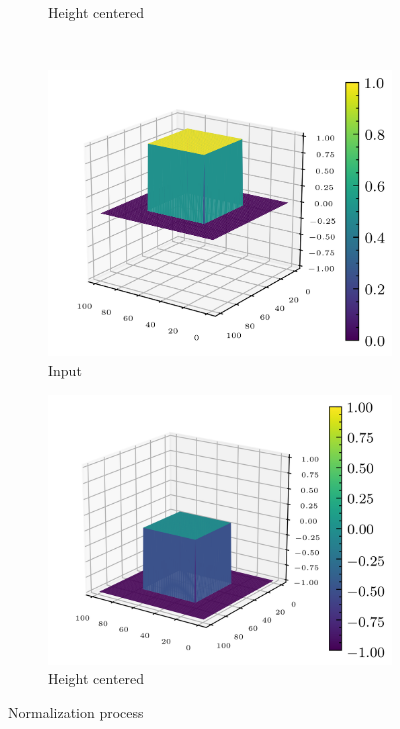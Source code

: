 \documentclass[../document.tex]{subfiles}
\begin{document}
\begin{figure}[H]
\begin{subfigure}[b]{0.32\textwidth}
        \caption{Height centered}
    \end{subfigure}  
    \\
          \begin{subfigure}[b]{0.32\textwidth}
        \includegraphics[width=\textwidth]{../img/data-aug/3d/square-middle.png}
        \caption{Input}
    \end{subfigure}
    \begin{subfigure}[b]{0.32\textwidth}
        \includegraphics[width=\textwidth]{../img/data-aug/3d/square-middle-center.png}
        \caption{Height centered}
    \end{subfigure}  
\label{fig: center}
\caption{Normalization process}    
\end{figure}
\end{document}
